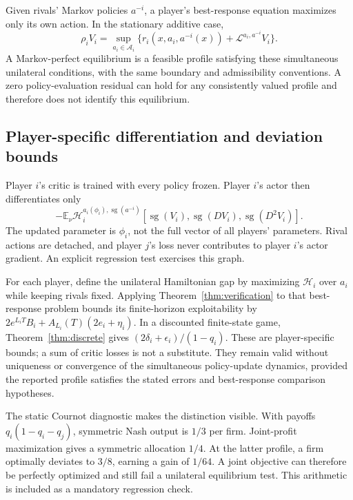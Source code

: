 \documentclass[ecta,draft]{econsocart}
\theoremstyle{definition}
\theoremstyle{remark}
\newcommand{\E}{\mathbb E}
\newcommand{\HH}{\mathcal H}
\newcommand{\LL}{\mathcal L}
\newcommand{\Act}{\mathcal A}
\newcommand{\sg}{\operatorname{sg}}
\begin{document}
Given rivals' Markov policies $a^{-i}$, a player's best-response equation maximizes only its own action. In the stationary additive case,
\begin{equation}\label{eq:game}
 \rho_i V_i=\sup_{a_i\in\Act_i}\{r_i(x,a_i,a^{-i}(x))+\LL^{a_i,a^{-i}}V_i\}.
\end{equation}
A Markov-perfect equilibrium is a feasible profile satisfying these simultaneous unilateral conditions, with the same boundary and admissibility conventions. A zero policy-evaluation residual can hold for any consistently valued profile and therefore does not identify this equilibrium.

\subsection{Player-specific differentiation and deviation bounds}
Player $i$'s critic is trained with every policy frozen. Player $i$'s actor then differentiates only
\begin{equation}\label{eq:gameactor}
 -\E_\nu\HH_i^{a_i(\phi_i),\sg(a^{-i})}
       [\sg(V_i),\sg(DV_i),\sg(D^2V_i)].
\end{equation}
The updated parameter is $\phi_i$, not the full vector of all players' parameters. Rival actions are detached, and player $j$'s loss never contributes to player $i$'s actor gradient. An explicit regression test exercises this graph.

For each player, define the unilateral Hamiltonian gap by maximizing $\HH_i$ over $a_i$ while keeping rivals fixed. Applying Theorem~\ref{thm:verification} to that best-response problem bounds its finite-horizon exploitability by $2e^{L_iT}B_i+A_{L_i}(T)(2e_i+\eta_i)$. In a discounted finite-state game, Theorem~\ref{thm:discrete} gives $(2\delta_i+\epsilon_i)/(1-q_i)$. These are player-specific bounds; a sum of critic losses is not a substitute. They remain valid without uniqueness or convergence of the simultaneous policy-update dynamics, provided the reported profile satisfies the stated errors and best-response comparison hypotheses.

The static Cournot diagnostic makes the distinction visible. With payoffs $q_i(1-q_i-q_j)$, symmetric Nash output is $1/3$ per firm. Joint-profit maximization gives a symmetric allocation $1/4$. At the latter profile, a firm optimally deviates to $3/8$, earning a gain of $1/64$. A joint objective can therefore be perfectly optimized and still fail a unilateral equilibrium test. This arithmetic is included as a mandatory regression check.
\end{document}

